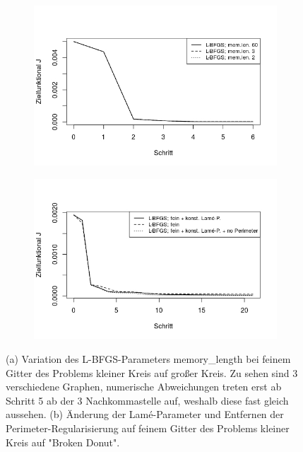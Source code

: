 \begin{figure}
	\begin{subfigure}{0.5\textwidth}
	\centering
	\includegraphics[scale=0.48]{plot_circle_bfgs_fine_memlen.jpeg}
	\caption{}	
	\end{subfigure}
	\begin{subfigure}{0.5\textwidth}
	\centering
	\includegraphics[scale=0.48]{plot_donut_bfgs_fine_lame.jpeg}
	\caption{}	
	\end{subfigure}
\caption{(a) Variation des L-BFGS-Parameters \textsf{memory\_length} bei feinem Gitter des Problems kleiner Kreis auf großer Kreis. Zu sehen sind 3 verschiedene Graphen, numerische Abweichungen treten erst ab Schritt 5 ab der 3 Nachkommastelle auf, weshalb diese fast gleich aussehen. \newline (b) Änderung der Lamé-Parameter und Entfernen der Perimeter-Regularisierung auf feinem Gitter des Problems kleiner Kreis auf "Broken  Donut".}
\label{plot_memlen_lame}
\end{figure}

